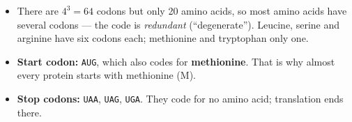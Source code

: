 \documentclass[11pt, oneside]{book}
\newcommand{\seq}[1]{\texttt{#1}}
\begin{document}
\begin{defbox}[title={The genetic code}]
\begin{itemize}
  \item There are $4^3 = 64$ codons but only 20 amino acids, so most amino
    acids have several codons --- the code is \emph{redundant} (``degenerate'').
    Leucine, serine and arginine have six codons each; methionine and
    tryptophan only one.
  \item \textbf{Start codon:} \seq{AUG}, which also codes for
    \textbf{methionine}. That is why almost every protein starts with
    methionine (M).
  \item \textbf{Stop codons:} \seq{UAA}, \seq{UAG}, \seq{UGA}. They code for no
    amino acid; translation ends there.
\end{itemize}
\end{defbox}
\end{document}
